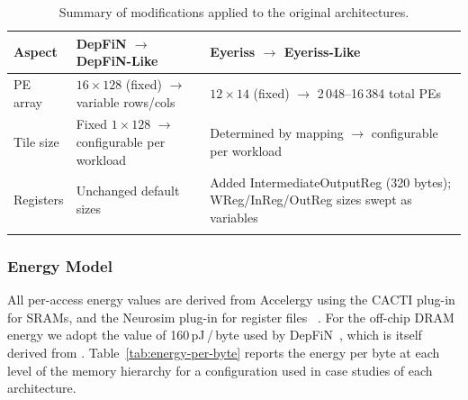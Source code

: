\begin{table}[htbp]
  \centering
  \caption{Summary of modifications applied to the original architectures.}
  \label{tab:modified-arch-comparison}
  \small
  \begin{tabular}{l p{5cm} p{5cm}}
    \toprule
    \textbf{Aspect}
      & \textbf{DepFiN $\to$ DepFiN-Like}
      & \textbf{Eyeriss $\to$ Eyeriss-Like} \\
    \midrule
    PE array
      & $16 \times 128$ (fixed) $\to$ variable rows/cols
      & $12 \times 14$ (fixed) $\to$ 2\,048--16\,384 total PEs \\
    \addlinespace
    Tile size
      & Fixed $1 \times 128$ $\to$ configurable per workload
      & Determined by mapping $\to$ configurable per workload \\
    \addlinespace
    Registers
      & Unchanged default sizes
      & Added IntermediateOutputReg (320 bytes);
        WReg/InReg/OutReg sizes swept as variables \\
    & & \\
    \bottomrule
  \end{tabular}
\end{table}

\subsubsection{Energy Model}
\label{sec:energy-model}

All per-access energy values are derived from
Accelergy using the CACTI plug-in for SRAMs,
and the Neurosim plug-in for register files ~\cite{wu2019accelergy}.
For the off-chip DRAM energy we adopt the value of
160\,pJ\,/\,byte used by DepFiN~\cite{goetschalckx2023depfin}, which is itself
derived from \cite{jedec_lpddr4}.
Table~\ref{tab:energy-per-byte} reports the energy per byte at each
level of the memory hierarchy for a configuration used in case studies of
each architecture.

